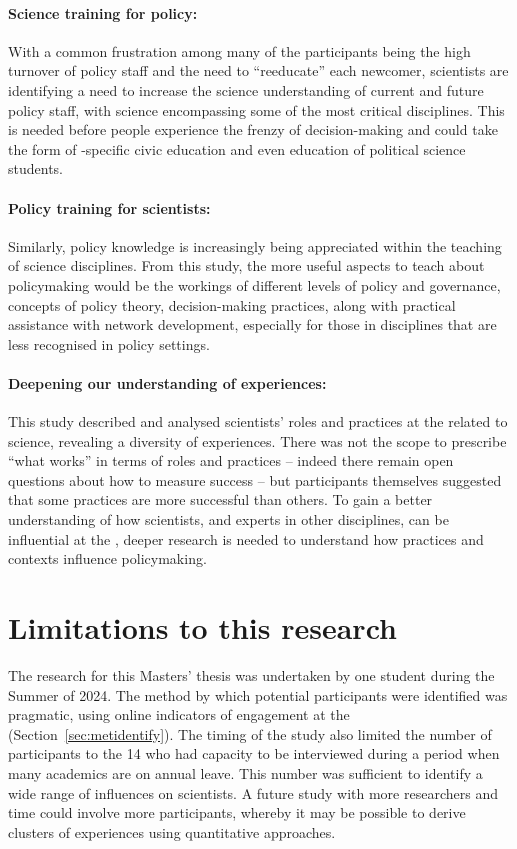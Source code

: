\paragraph{Science training for policy:}
With a common frustration among many of the participants being the high turnover of policy staff and the need to ``reeducate'' each newcomer, scientists are identifying a need to increase the science understanding of current and future policy staff, with \CAN{} science encompassing some of the most critical disciplines. This is needed before people experience the frenzy of decision-making and could take the form of \CAN-specific civic education and even education of political science students.

\paragraph{Policy training for scientists:}
Similarly, policy knowledge is increasingly being appreciated within the teaching of science disciplines. From this study, the more useful aspects to teach about policymaking would be the workings of different levels of policy and governance, concepts of policy theory, decision-making practices, along with practical assistance with network development, especially for those in disciplines that are less recognised in policy settings. 

\paragraph{Deepening our understanding of experiences:}
This study described and analysed scientists' roles and practices at the \SPI{} related to \CAN{} science, revealing a diversity of experiences. There was not the scope to prescribe ``what works'' in terms of roles and practices -- indeed there remain open questions about how to measure success -- but participants themselves suggested that some practices are more successful than others. To gain a better understanding of how scientists, and experts in other disciplines, can be influential at the \SPI, deeper research is needed to understand how practices and contexts influence policymaking.

\section{Limitations to this research}
The research for this Masters' thesis was undertaken by one student during the Summer of 2024. The method by which potential participants were identified was pragmatic, using online indicators of engagement at the \SPI{} (Section~\ref{sec:metidentify}). The timing of the study also limited the number of participants to the 14 who had capacity to be interviewed during a period when many academics are on annual leave. This number was sufficient to identify a wide range of influences on scientists. A future study with more researchers and time could involve more participants, whereby it may be possible to derive clusters of experiences using quantitative approaches.%

